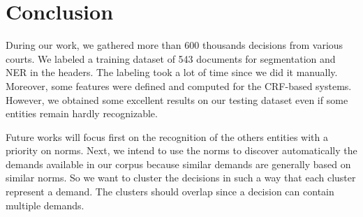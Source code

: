 \documentclass[runningheads,a4paper]{llncs}
\begin{document}
\section{Conclusion}

During our work, we gathered more than 600 thousands decisions from various courts. We labeled a training dataset of 543 documents for segmentation and NER in the headers. The labeling took a lot of time since we did it manually. Moreover, some features were defined and computed for the CRF-based systems. However, we obtained some excellent results on our testing dataset even if some entities remain hardly recognizable.

Future works will focus first on the recognition of the others entities with a priority on norms. Next, we intend to use the norms to discover automatically the demands available in our corpus because similar demands are generally based on similar norms. So we want to cluster the decisions in such a way that each cluster represent a demand. The clusters should overlap since a decision can contain multiple demands.
 



\end{document}
